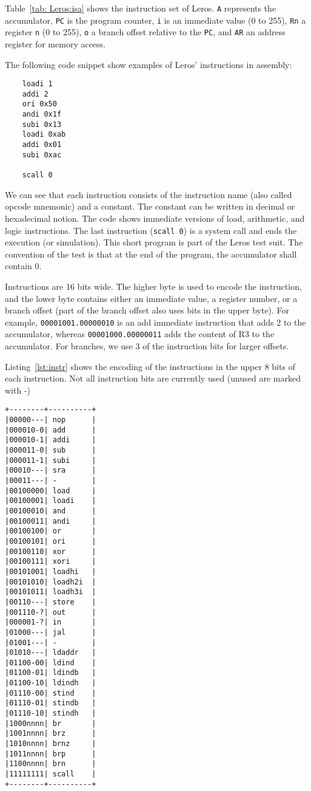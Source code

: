 \documentclass[%
    10pt,
    headinclude, footexclude,
    openright, %
    notitlepage,
    cleardoubleempty,
    headsepline,
    pointlessnumbers,
    bibtotoc, idxtotoc,
    ]{scrbook}
\newcommand{\code}[1]{{\lstinline[basicstyle=\small\ttfamily]{#1}}}
\begin{document}
Table~\ref{tab: Leros:isa} shows the instruction set of Leros.
\code{A} represents the accumulator, \code{PC} is the program counter,
\code{i} is an immediate value (0 to 255), \code{Rn} a register
\code{n} (0 to 255), \code{o} a branch offset relative to the \code{PC},
and \code{AR} an address register for memory access.

The following code snippet show examples of Leros' instructions in assembly:

\begin{verbatim}
	loadi 1
	addi 2
	ori 0x50
	andi 0x1f
	subi 0x13
	loadi 0xab
	addi 0x01
	subi 0xac

	scall 0
\end{verbatim}

\noindent We can see that each instruction consists of the instruction name (also called
opcode mnemonic) and a constant. The constant can be written in decimal or
hexadecimal notion. The code shows immediate versions of load, arithmetic,
and logic instructions. The last instruction (\code{scall 0}) is a system call and
ends the execution (or simulation).
This short program is part of the Leros test suit.
The convention of the test is that at the end of the program, the accumulator shall
contain 0.

Instructions are 16 bits wide. The higher byte is used to encode the instruction,
and the lower byte contains either an immediate value, a register number,
or a branch offset (part of the branch offset also uses bits in the upper byte).
For example, \code{00001001.00000010} is an add immediate instruction
that adds 2 to the accumulator, whereas \code{00001000.00000011} adds the
content of R3 to the accumulator. For branches, we use 3 of the instruction
bits for larger offsets.

Listing~\ref{lst:instr} shows the encoding of the instructions in the upper 8 bits of
each instruction.
Not all instruction bits are currently used (unused are marked with -)

\begin{lstlisting}[float, caption=Leros instruction encoding., label=lst:instr, frame=tb, captionpos=b]
+--------+----------+
|00000---| nop      |
|000010-0| add      |
|000010-1| addi     |
|000011-0| sub      |
|000011-1| subi     |
|00010---| sra      |
|00011---| -        |
|00100000| load     |
|00100001| loadi    |
|00100010| and      |
|00100011| andi     |
|00100100| or       |
|00100101| ori      |
|00100110| xor      |
|00100111| xori     |
|00101001| loadhi   |
|00101010| loadh2i  |
|00101011| loadh3i  |
|00110---| store    |
|001110-?| out      |
|000001-?| in       |
|01000---| jal      |
|01001---| -        |
|01010---| ldaddr   |
|01100-00| ldind    |
|01100-01| ldindb   |
|01100-10| ldindh   |
|01110-00| stind    |
|01110-01| stindb   |
|01110-10| stindh   |
|1000nnnn| br       |
|1001nnnn| brz      |
|1010nnnn| brnz     |
|1011nnnn| brp      |
|1100nnnn| brn      |
|11111111| scall    |
+--------+----------+
\end{lstlisting}
\end{document}
